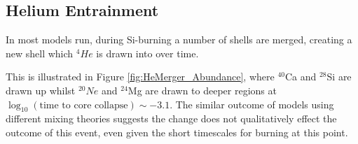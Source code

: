 \subsection{Helium Entrainment}

In most models run, during Si-burning a number of shells are merged, creating a new shell which $^{4}He$ is drawn into over time.

This is illustrated in Figure \ref{fig:HeMerger_Abundance}, where $^{40}$Ca and $^{28}$Si are drawn up whilst $^{20}Ne$ and $^{24}$Mg are drawn to deeper regions at $\log_{10}\left(\text{time to core collapse}\right) \sim -3.1$. The similar outcome of models using different mixing theories suggests the change does not qualitatively effect the outcome of this event, even given the short timescales for burning at this point. 

